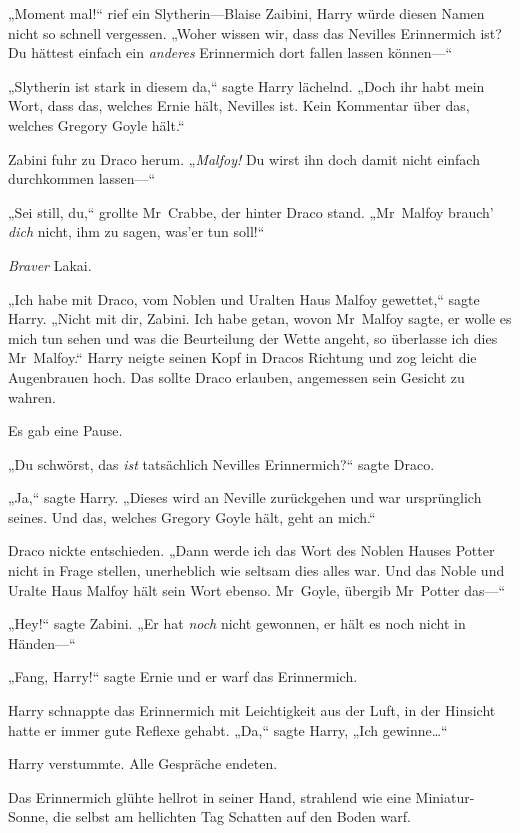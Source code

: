 {„Moment mal!“ rief ein Slytherin—Blaise Zaibini, Harry würde diesen Namen nicht so schnell vergessen. „Woher wissen wir, dass das Nevilles Erinnermich ist? Du hättest einfach ein \emph{anderes} Erinnermich dort fallen lassen können—“

„Slytherin ist stark in diesem da,“ sagte Harry lächelnd. „Doch ihr habt mein Wort, dass das, welches Ernie hält, Nevilles ist. Kein Kommentar über das, welches Gregory Goyle hält.“

Zabini fuhr zu Draco herum. „\emph{Malfoy!} Du wirst ihn doch damit nicht einfach durchkommen lassen—“

„Sei still, du,“ grollte Mr~Crabbe, der hinter Draco stand. „Mr~Malfoy brauch' \emph{dich} nicht, ihm zu sagen, was'er tun soll!“

\emph{Braver} Lakai.

„Ich habe mit Draco, vom Noblen und Uralten Haus Malfoy gewettet,“ sagte Harry. „Nicht mit dir, Zabini. Ich habe getan, wovon Mr~Malfoy sagte, er wolle es mich tun sehen und was die Beurteilung der Wette angeht, so überlasse ich dies Mr~Malfoy.“ Harry neigte seinen Kopf in Dracos Richtung und zog leicht die Augenbrauen hoch. Das sollte Draco erlauben, angemessen sein Gesicht zu wahren.

Es gab eine Pause.

„Du schwörst, das \emph{ist} tatsächlich Nevilles Erinnermich?“ sagte Draco.

„Ja,“ sagte Harry. „Dieses wird an Neville zurückgehen und war ursprünglich seines. Und das, welches Gregory Goyle hält, geht an mich.“

Draco nickte entschieden. „Dann werde ich das Wort des Noblen Hauses Potter nicht in Frage stellen, unerheblich wie seltsam dies alles war. Und das Noble und Uralte Haus Malfoy hält sein Wort ebenso. Mr~Goyle, übergib Mr~Potter das—“

„Hey!“ sagte Zabini. „Er hat \emph{noch} nicht gewonnen, er hält es noch nicht in Händen—“

„Fang, Harry!“ sagte Ernie und er warf das Erinnermich.

Harry schnappte das Erinnermich mit Leichtigkeit aus der Luft, in der Hinsicht hatte er immer gute Reflexe gehabt. „Da,“ sagte Harry, „Ich gewinne…“

Harry verstummte. Alle Gespräche endeten.

Das Erinnermich glühte hellrot in seiner Hand, strahlend wie eine Miniatur-Sonne, die selbst am hellichten Tag Schatten auf den Boden warf.

}

